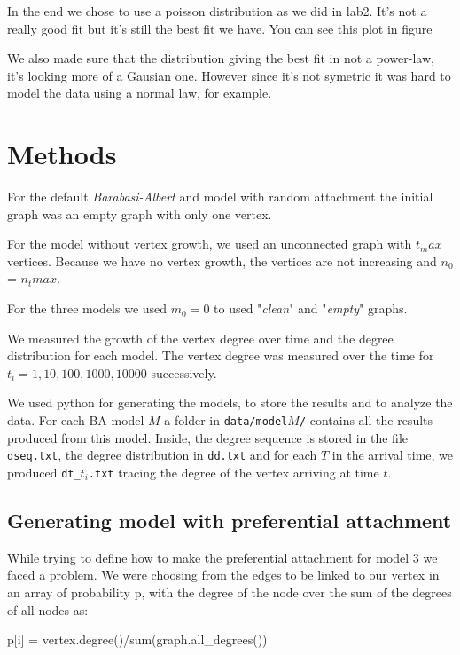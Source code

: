 \documentclass{article}
\begin{document}
In the end we chose to use a poisson distribution as we did in lab2. It's not a 
really good fit but it's still the best fit we have. You can see this plot in 
figure

We also made sure that the distribution giving the best fit in not a power-law, 
it's looking more of a Gausian one. However since it's not symetric it was hard 
to model the data using a normal law, for example.

\section{Methods} \label{methods}

For the default \textit{Barabasi-Albert} and model with random attachment the 
initial graph was an empty graph with only one vertex.

For the model without vertex growth, we used an unconnected graph with $t_max$ 
vertices. Because we have no vertex growth, the vertices are not increasing and 
$n_0$ = $n_tmax$.

For the three models we used $m_0 = 0$ to used "\textit{clean}" and 
"\textit{empty}" graphs.

We measured the growth of the vertex degree over time and the degree 
distribution for each model. The vertex degree was measured over the time for 
$t_i = 1, 10, 100, 1000, 10000$ successively.

We used python for generating the models, to store the results and to analyze 
the data. For each BA model $M$ a folder in \texttt{data/model$M$/} contains all 
the results produced from this model. Inside, the degree sequence is stored in 
the file \texttt{dseq.txt}, the degree distribution in \texttt{dd.txt} and for 
each $T$ in the arrival time, we produced \texttt{dt\_$t_i$.txt} tracing the 
degree of the vertex arriving at time $t$.

\subsection{Generating model with preferential attachment}

While trying to define how to make the preferential attachment for model 3 we 
faced a problem. We were choosing from the edges to be linked to our vertex in 
an array of probability p, with the degree of the node over the sum of the 
degrees of all nodes as:

\begin{python}
    p[i] = vertex.degree()/sum(graph.all_degrees())
\end{python}
\end{document}

